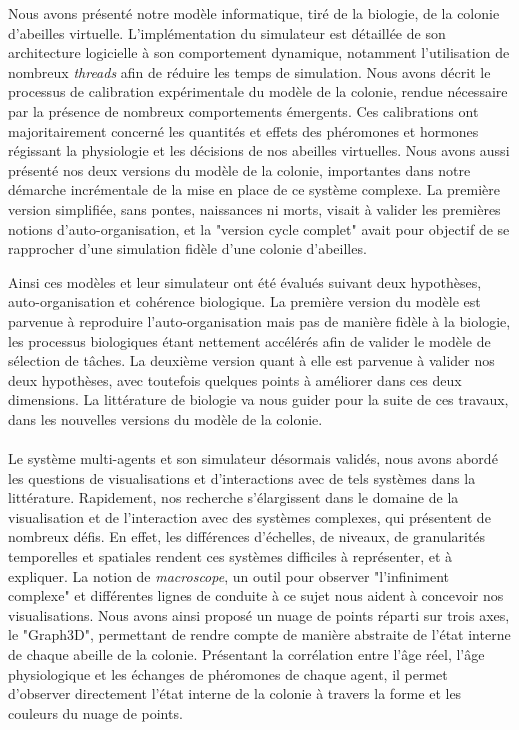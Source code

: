 Nous avons présenté notre modèle informatique, tiré de la biologie, de la colonie d'abeilles virtuelle. L'implémentation du simulateur est détaillée de son architecture logicielle à son comportement dynamique, notamment l'utilisation de nombreux \textit{threads} afin de réduire les temps de simulation. Nous avons décrit le processus de calibration expérimentale du modèle de la colonie, rendue nécessaire par la présence de nombreux comportements émergents. Ces calibrations ont majoritairement concerné les quantités et effets des phéromones et hormones régissant la physiologie et les décisions de nos abeilles virtuelles. Nous avons aussi présenté nos deux versions du modèle de la colonie, importantes dans notre démarche incrémentale de la mise en place de ce système complexe. La première version simplifiée, sans pontes, naissances ni morts, visait à valider les premières notions d'auto-organisation, et la "version cycle complet" avait pour objectif de se rapprocher d'une simulation fidèle d'une colonie d'abeilles.

Ainsi ces modèles et leur simulateur ont été évalués suivant deux hypothèses, auto-organisation et cohérence biologique. La première version du modèle est parvenue à reproduire l'auto-organisation mais pas de manière fidèle à la biologie, les processus biologiques étant nettement accélérés afin de valider le modèle de sélection de tâches. La deuxième version quant à elle est parvenue à valider nos deux hypothèses, avec toutefois quelques points à améliorer dans ces deux dimensions. La littérature de biologie va nous guider pour la suite de ces travaux, dans les nouvelles versions du modèle de la colonie.

\paragraph{}

Le système multi-agents et son simulateur désormais validés, nous avons abordé les questions de visualisations et d'interactions avec de tels systèmes dans la littérature. Rapidement, nos recherche s'élargissent dans le domaine de la visualisation et de l'interaction avec des systèmes complexes, qui présentent de nombreux défis. En effet, les différences d'échelles, de niveaux, de granularités temporelles et spatiales rendent ces systèmes difficiles à représenter, et à expliquer. La notion de \textit{macroscope}, un outil pour observer "l'infiniment complexe" et différentes lignes de conduite à ce sujet nous aident à concevoir nos visualisations. Nous avons ainsi proposé un nuage de points réparti sur trois axes, le "Graph3D", permettant de rendre compte de manière abstraite de l'état interne de chaque abeille de la colonie. Présentant la corrélation entre l'âge réel, l'âge physiologique et les échanges de phéromones de chaque agent, il permet d'observer directement l'état interne de la colonie à travers la forme et les couleurs du nuage de points.

